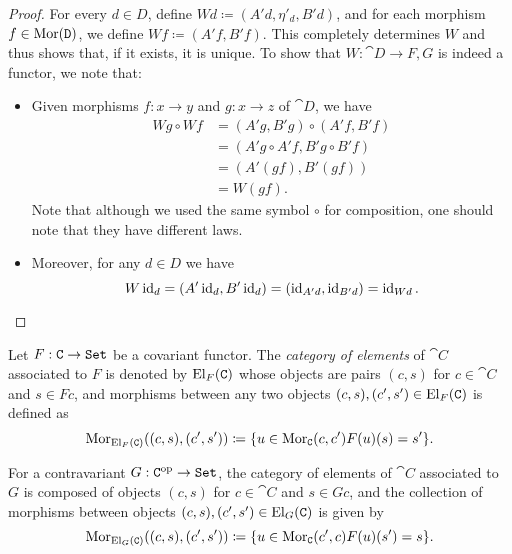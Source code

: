 \begin{proof}
    For every \(d \in D\), define \(W d \coloneq (A' d, \eta'_d, B' d)\), and for
    each morphism \(f \in \operatorname{Mor}(\texttt D)\), we define \(W f \coloneq (A' f, B'
    f)\). This completely determines \(W\) and thus shows that, if it exists, it is
    unique. To show that \(W: \cat D \to F \comma G\) is indeed a functor, we note
    that:
    \begin{itemize}\setlength\itemsep{0em}
        \item Given morphisms \(f: x \to y\) and \(g: x \to z\) of \(\cat D\), we have
              \begin{align*}
                  W g \circ W f
                   & = (A' g, B' g) \circ (A' f, B' f)    \\
                   & = (A' g \circ A' f, B' g \circ B' f) \\
                   & = (A' (g f), B' (g f))               \\
                   & = W (g f).
              \end{align*}
              Note that although we used the same symbol \(\circ\) for composition, one
              should note that they have different laws.
        \item Moreover, for any \(d \in D\) we have
              \[
                  W \operatorname{id}_d
                  = (A' \operatorname{id}_d, B' \operatorname{id}_d)
                  = (\operatorname{id}_{A' d}, \operatorname{id}_{B' d})
                  = \operatorname{id}_{W d}.
              \]
    \end{itemize}
\end{proof}

\begin{definition}
    \label{def:category-of-elements}
    Let \(F: \texttt C \to {\texttt{Set}}\) be a covariant functor. The \emph{category of
        elements} of \(\cat C\) associated to \(F\) is denoted by \(\operatorname{El}_F(\texttt C)\)
    whose objects are pairs \((c, s)\) for \(c \in \cat C\) and \(s \in F c\), and
    morphisms between any two objects \((c, s), (c', s') \in \operatorname{El}_F(\texttt C)\) is
    defined as
    \[
        \operatorname{Mor}_{\operatorname{El}_F(\texttt C)}((c, s), (c', s')) \coloneq
        \{u \in \operatorname{Mor}_{\texttt C}(c, c') \relax F(u)(s) = s'\}.
    \]

    For a contravariant \(G: \texttt C^{\mathrm{op}} \to {\texttt{Set}}\), the category of elements of
    \(\cat C\) associated to \(G\) is composed of objects \((c, s)\) for
    \(c \in \cat C\) and \(s \in G c\), and the collection of morphisms between
    objects \((c, s), (c', s') \in \operatorname{El}_G(\texttt C)\) is given by
    \[
        \operatorname{Mor}_{\operatorname{El}_G(\texttt C)}((c, s), (c', s')) \coloneq
        \{u \in \operatorname{Mor}_{\texttt C}(c', c) \relax F(u)(s') = s\}.
    \]
\end{definition}

